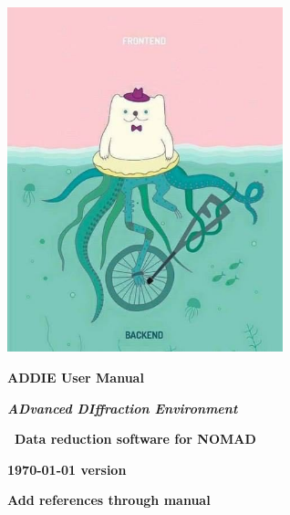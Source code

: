 \documentclass{report}
\begin{document}
{\let\cleardoublep
\clearpage 
\begin{titlepage}
	\centering
	\includegraphics[width=0.6\textwidth]{graphics/joke_image.jpg}\par\vspace{1cm}
	\vspace{2cm}
	{\huge\bfseries ADDIE User Manual\par}
	{\LARGE\bfseries\itshape ADvanced DIffraction Environment\par}
	\vspace{1cm}
	{\Large\bfseries\ Data reduction software for NOMAD\par}
	\vfill
	{\large\bfseries \today{} version \par}
\end{titlepage}
 

 \tableofcontents

}

 




\textbf{Add references through manual}
\end{document}
